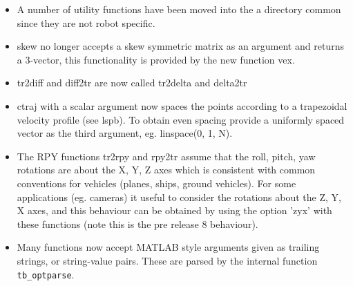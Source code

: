 \documentclass[a4paper]{report}
\begin{document}
\begin{itemize}
\item A number of utility functions have been moved into the a directory common since they are not robot specific.
\item skew no longer accepts a skew symmetric matrix as an argument and returns a 3-vector, this functionality is provided by the new function vex.
\item tr2diff and diff2tr are now called tr2delta and delta2tr
\item ctraj with a scalar argument now spaces the points according to a trapezoidal velocity profile (see lspb). To obtain even spacing provide a uniformly spaced vector as the third argument, eg. linspace(0, 1, N).
\item The RPY functions tr2rpy and rpy2tr assume that the roll, pitch, yaw rotations are about the X, Y, Z axes which is consistent with common conventions for vehicles (planes, ships, ground vehicles). For some applications (eg. cameras) it useful to consider the rotations about the Z, Y, X axes, and this behaviour can be obtained by using the option 'zyx' with these functions (note this is the pre release 8 behaviour).
\item Many functions now accept MATLAB style arguments given as trailing strings, or string-value pairs.  These are parsed by the internal
function \texttt{tb\_optparse}.
\end{itemize}
\end{document}

